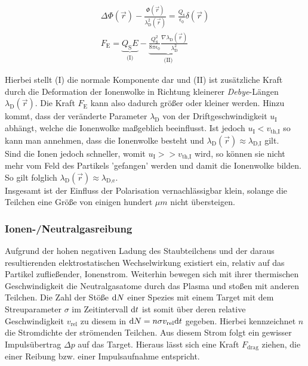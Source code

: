 \documentclass[numbers=noenddot,a4paper]{scrartcl}
\newcommand{\diff}{\textnormal{d}}
\newcommand{\ix}[1]{_\text{#1}}
\newcommand{\tilt}[1]{\textit{#1}}
\begin{document}
					\begin{align}
						\Delta \Phi\left(\vec{r}\right)-\frac{\Phi\left(\vec{r}\right)}{\lambda\ix{D}^2\left(\vec{r}\right)}=\frac{Q\ix{s}}{\epsilon\ix{0}}\delta\left(\vec{r}\right) \\
						F\ix{E}=\underbrace{Q\ix{S}E}_{\text{(I)}}-\underbrace{\frac{Q\ix{S}^2}{8\pi\epsilon\ix{0}}\frac{\nabla\lambda\ix{D}\left(\vec{r}\right)}{\lambda\ix{D}^2}}_{\text{(II)}}
					\end{align}
				
				Hierbei stellt (I) die normale Komponente dar und (II) ist zusätzliche Kraft durch die Deformation der Ionenwolke in Richtung kleinerer \tilt{Debye}-Längen $\lambda\ix{D}\left(\vec{r}\right)$. Die Kraft $F\ix{E}$ kann also dadurch größer oder kleiner werden. Hinzu kommt, dass der veränderte Parameter $\lambda\ix{D}$ von der Driftgeschwindigkeit $u\ix{I}$ abhängt, welche die Ionenwolke maßgeblich beeinflusst. Ist jedoch $u\ix{I}<v\ix{th,I}$ so kann man annehmen, dass die Ionenwolke besteht und $\lambda\ix{D}\left(\vec{r}\right)\approx\lambda\ix{D,I}$ gilt.\\
				Sind die Ionen jedoch schneller, womit $u\ix{I}>>v\ix{th,I}$ wird, so können sie nicht mehr vom Feld des Partikels 'gefangen' werden und damit die Ionenwolke bilden. So gilt folglich $\lambda\ix{D}\left(\vec{r}\right)\approx\lambda\ix{D,e}$.\\
				Insgesamt ist der Einfluss der Polarisation vernachlässigbar klein, solange die Teilchen eine Größe von einigen hundert $\unit{\mu m}$ nicht übersteigen.

			\subsubsection{Ionen-/Neutralgasreibung}\label{subsub:reibung}

				Aufgrund der hohen negativen Ladung des Staubteilchens und der daraus resultierenden elektrostatischen Wechselwirkung existiert ein, relativ auf das Partikel zufließender, Ionenstrom. Weiterhin bewegen sich mit ihrer thermischen Geschwindigkeit die Neutralgasatome durch das Plasma und stoßen mit anderen Teilchen. Die Zahl der Stöße $\diff N$ einer Spezies mit einem Target mit dem Streuparameter $\sigma$ im Zeitintervall $\diff t$ ist somit über deren relative Geschwindigkeit $v\ix{rel}$ zu diesem in $\diff N=n\sigma v\ix{rel}\diff t$ gegeben. Hierbei kennzeichnet $n$ die Stromdichte der strömenden Teilchen. Aus diesem Strom folgt ein gewisser Impulsübertrag $\Delta p$ auf das Target. Hieraus lässt sich eine Kraft $F\ix{drag}$ ziehen, die einer Reibung bzw. einer Impulsaufnahme entspricht.
				
\end{document}
